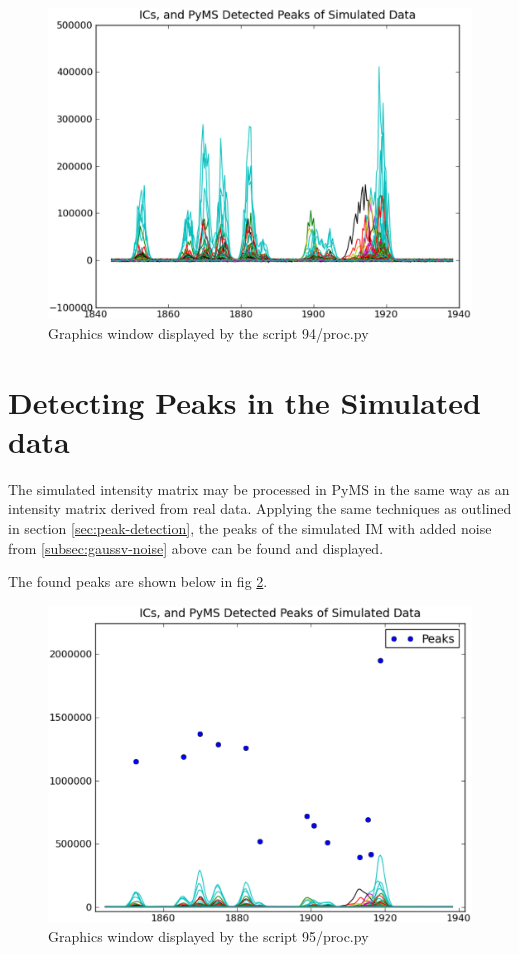 \begin{figure}[h]
  \begin{center}
    \includegraphics[scale=0.25]{graphics/chapter09/test-94.eps}
  \end{center}
  \caption{Graphics window displayed by the script 94/proc.py}
  \label{fig:gaussv-noise}
\end{figure}

\section{Detecting Peaks in the Simulated data}


The simulated intensity matrix may be processed in PyMS in the same way as an intensity
matrix derived from real data. Applying the same techniques as outlined in section 
\ref{sec:peak-detection}, the peaks of the simulated IM with added noise from 
\ref{subsec:gaussv-noise} above can be found and displayed.

The found peaks are shown below in fig \ref{fig:sim-peaks}.

\begin{figure}[h]
  \begin{center}
    \includegraphics[scale=0.25]{graphics/chapter09/test-95.eps}
  \end{center}
  \caption{Graphics window displayed by the script 95/proc.py}
  \label{fig:sim-peaks}
\end{figure}
